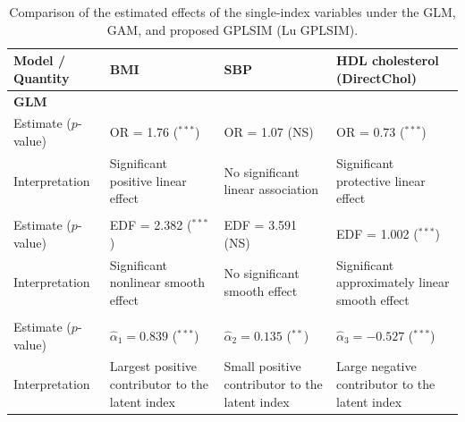 \begin{table}[ht!]
\centering
\caption{Comparison of the estimated effects of the single-index variables under the GLM, GAM, and proposed GPLSIM (Lu GPLSIM).}
\label{tab:singleindex_compare}
\small
\begin{tabular}{p{2.2cm}p{3.8cm}p{3.8cm}p{3.8cm}}
\toprule
\textbf{Model / Quantity}
&
\textbf{BMI}
&
\textbf{SBP}
&
\textbf{HDL cholesterol (DirectChol)}
\\
\midrule

\multicolumn{4}{l}{\textbf{GLM}}\\

Estimate ($p$-value) &
OR = 1.76 ($^{***}$) &
OR = 1.07 (NS) &
OR = 0.73 ($^{***}$) \\

Interpretation &
Significant positive linear effect &
No significant linear association &
Significant protective linear effect \\

\addlinespace

\multicolumn{4}{l}{\textbf{GAM}}\\

Estimate ($p$-value) &
EDF = 2.382 ($^{***}$) &
EDF = 3.591 (NS) &
EDF = 1.002 ($^{***}$) \\

Interpretation &
Significant nonlinear smooth effect &
No significant smooth effect &
Significant approximately linear smooth effect \\

\addlinespace

\multicolumn{4}{l}{\textbf{Lu GPLSIM}}\\

Estimate ($p$-value) &
$\hat{\alpha}_1 = 0.839$ ($^{***}$) &
$\hat{\alpha}_2 = 0.135$ ($^{**}$) &
$\hat{\alpha}_3 = -0.527$ ($^{***}$) \\

Interpretation &
Largest positive contributor to the latent index &
Small positive contributor to the latent index &
Large negative contributor to the latent index \\

\bottomrule
\end{tabular}

\vspace{0.15cm}


\end{table}
